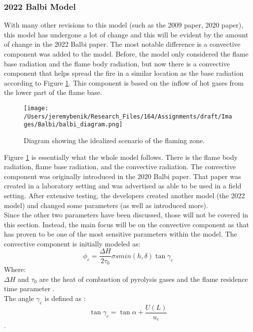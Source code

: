 \documentclass{article}
\begin{document}
\subsubsection*{2022 Balbi Model}
\indent With many other revisions to this model (such as the 2009 paper, 2020 paper), this model has undergone a lot of change and this will be evident by the amount of change in the 2022 Balbi paper. The most notable difference is a convective component was added to the model. Before, the model only considered the flame base radiation and the flame body radiation, but now there is a convective component that helps spread the fire in a similar location as the base radiation according to Figure \ref{Balbi_flame_diagram}. This component is based on the inflow of hot gases from the lower part of the flame base. \\
\begin{figure}[h]
\centering
  \texttt{[image: /Users/jeremybenik/Research\_Files/164/Assignments/draft/Images/Balbi/balbi\_diagram.png]}
  \caption{Diagram showing the idealized scenario of the flaming zone.}
  \label{Balbi_flame_diagram}
\end{figure}
\indent Figure \ref{Balbi_flame_diagram} is essentially what the whole model follows. There is the flame body radiation, flame base radiation, and the convective radiation. The convective component was originally introduced in the 2020 Balbi paper. That paper was created in a laboratory setting and was advertised as able to be used in a field setting. After extensive testing, the developers created another model (the 2022 model) and changed some parameters (as well as introduced more). \\
\indent Since the other two parameters have been discussed, those will not be covered in this section. Instead, the main focus will be on the convective component as that has proven to be one of the most sensitive parameters within the model. The convective component is initially modeled as:
\begin{equation}
	\label{convection intro}
	\phi _ c = \frac {\Delta H} {2 \tau _ 0} \sigma s min(h, \delta) \tan \gamma _ c
\end{equation}
Where: \\
$\Delta H$ and $\tau _ 0$ are the heat of combustion of pyrolysis gases and the flame residence time parameter \citep{Chatelon2022}.\\
\indent The angle $\gamma _ {c}$ is defined as :
\begin{equation}
	\tan \gamma _ {c} = \tan \alpha + \frac {U(L)} {u_{c}}
\end{equation}. 
\end{document}
